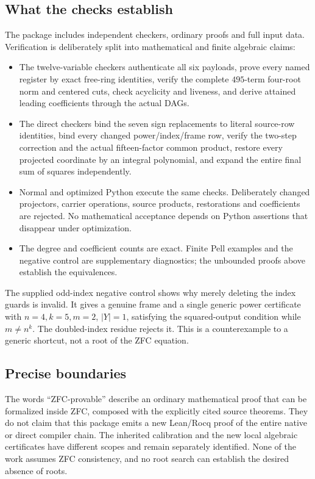\documentclass[11pt]{article}
\theoremstyle{definition}\newtheorem{definition}[theorem]{Definition}
\theoremstyle{remark}\newtheorem{remark}[theorem]{Remark}
\begin{document}
\subsection{What the checks establish}
The package includes independent checkers, ordinary proofs and full input
data. Verification is deliberately split into mathematical and finite
algebraic claims:
\begin{itemize}
\item The twelve-variable checkers authenticate all six payloads, prove
every named register by exact free-ring identities, verify the complete
$495$-term four-root norm and centered cuts, check acyclicity and liveness,
and derive attained leading coefficients through the actual DAGs.
\item The direct checkers bind the seven sign replacements to literal
source-row identities, bind every changed power/index/frame row, verify
the two-step correction and the actual fifteen-factor common product,
restore every projected coordinate by an integral polynomial, and expand
the entire final sum of squares independently.
\item Normal and optimized Python execute the same checks. Deliberately
changed projectors, carrier operations, source products, restorations
and coefficients are rejected. No mathematical acceptance depends on
Python assertions that disappear under optimization.
\item The degree and coefficient counts are exact. Finite Pell examples
and the negative control are supplementary diagnostics; the unbounded
proofs above establish the equivalences.
\end{itemize}

The supplied odd-index negative control shows why merely deleting the
index guards is invalid. It gives a genuine frame and a single generic
power certificate with $n=4,k=5,m=2$, $|Y|=1$, satisfying the squared-output
condition while $m\ne n^k$. The doubled-index residue rejects it. This
is a counterexample to a generic shortcut, not a root of the ZFC equation.

\subsection{Precise boundaries}
The words ``ZFC-provable'' describe an ordinary mathematical proof that
can be formalized inside ZFC, composed with the explicitly cited source
theorems. They do not claim that this package emits a new Lean/Rocq proof
of the entire native or direct compiler chain. The inherited calibration
and the new local algebraic certificates have different scopes and remain
separately identified. None of the work assumes ZFC consistency, and no
root search can establish the desired absence of roots.
\end{document}
